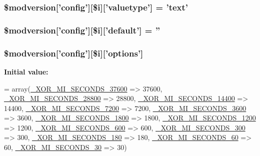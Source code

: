 \hypertarget{xoops__version_8php_a565f7b70c886b13fc870233f5bfcbeec}{
\subsubsection[{\$modversion}]{\setlength{\rightskip}{0pt plus 5cm}\$modversion\mbox{[}'config'\mbox{]}\mbox{[}\$i\mbox{]}\mbox{[}'valuetype'\mbox{]} = 'text'}}\label{xoops__version_8php_a565f7b70c886b13fc870233f5bfcbeec}
\hypertarget{xoops__version_8php_a8015bb547bd75a72113a2b7f832e0bf2}{
\subsubsection[{\$modversion}]{\setlength{\rightskip}{0pt plus 5cm}\$modversion\mbox{[}'config'\mbox{]}\mbox{[}\$i\mbox{]}\mbox{[}'default'\mbox{]} = ''}}\label{xoops__version_8php_a8015bb547bd75a72113a2b7f832e0bf2}
\hypertarget{xoops__version_8php_a2d446acc674eb0afef1c17e4237333c1}{
\subsubsection[{\$modversion}]{\setlength{\rightskip}{0pt plus 5cm}\$modversion\mbox{[}'config'\mbox{]}\mbox{[}\$i\mbox{]}\mbox{[}'options'\mbox{]}}}\label{xoops__version_8php_a2d446acc674eb0afef1c17e4237333c1}
{\bfseries Initial value\-:}
\begin{DoxyCode}
= array(\hyperlink{modinfo_8php_aee69ab7ded4ec47c6a5fcf212b8c11d7}{\_XOR\_MI\_SECONDS\_37600} => 37600, 
      \hyperlink{modinfo_8php_a6fcaf92838ff41d6ce6ae16c14257c15}{\_XOR\_MI\_SECONDS\_28800} => 28800, \hyperlink{modinfo_8php_a0cd2135208a59ea30fa98e1dcb1383a1}{\_XOR\_MI\_SECONDS\_14400} => 14400, 
      \hyperlink{modinfo_8php_a382482a9ac5c98c7f7458e02e14f4767}{\_XOR\_MI\_SECONDS\_7200} => 7200,
                                            \hyperlink{modinfo_8php_a4f525b1e66ba787037a4ee7cb6f414a4}{\_XOR\_MI\_SECONDS\_3600} => 3600, 
      \hyperlink{modinfo_8php_af64161e51d13555d38abe5356a56963f}{\_XOR\_MI\_SECONDS\_1800} => 1800, \hyperlink{modinfo_8php_a044a4868fce742ed414cecd78fcec1c8}{\_XOR\_MI\_SECONDS\_1200} => 1200, 
      \hyperlink{modinfo_8php_a1b6a50adfe344a78d47a78527c9079bf}{\_XOR\_MI\_SECONDS\_600} => 600,
                                            \hyperlink{modinfo_8php_a156d1cf6beff612993efa9e76aff5c35}{\_XOR\_MI\_SECONDS\_300} => 300, 
      \hyperlink{modinfo_8php_a046ce94d2f4d53b35278afde15160061}{\_XOR\_MI\_SECONDS\_180} => 180, \hyperlink{modinfo_8php_ae29e326ff0e84590aacc61999f409a24}{\_XOR\_MI\_SECONDS\_60} => 60, 
      \hyperlink{modinfo_8php_ad500389422d456a86753b693ecbd1d9b}{\_XOR\_MI\_SECONDS\_30} => 30)
\end{DoxyCode}
